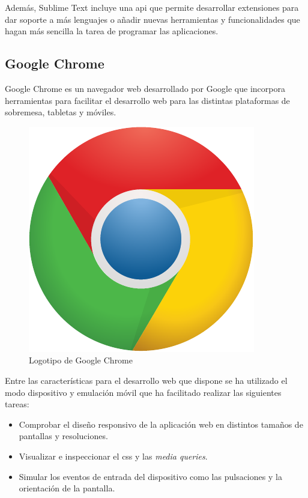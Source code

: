 Además, Sublime Text incluye una \acrshort{api} que permite desarrollar extensiones para dar soporte a más lenguajes o añadir nuevas herramientas y funcionalidades que hagan más sencilla la tarea de programar las aplicaciones.

\subsection{Google Chrome}

Google Chrome\cite{Chrome} es un navegador web desarrollado por Google\cite{Google} que incorpora herramientas para facilitar el desarrollo web para las distintas plataformas de sobremesa, tabletas y móviles.

\begin{figure}[!htp]
	 \centering
	 \includegraphics[scale=0.4]{fig/chrome}
	 \caption{Logotipo de Google Chrome}
\end{figure}

Entre las características para el desarrollo web que dispone se ha utilizado el modo dispositivo y emulación móvil\cite{DeviceMode} que ha facilitado realizar las siguientes tareas:

\begin{itemize}
	\item Comprobar el diseño responsivo de la aplicación web en distintos tamaños de pantallas y resoluciones.
	\item Visualizar e inspeccionar el \acrshort{css} y las \textit{media queries}.
	\item Simular los eventos de entrada del dispositivo como las pulsaciones y la orientación de la pantalla.
\end{itemize}

